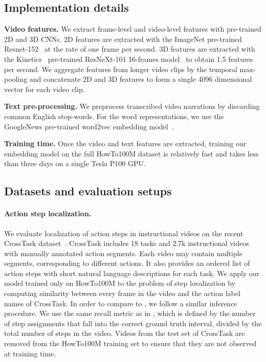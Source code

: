 \documentclass[10pt,twocolumn,letterpaper]{article}
\begin{document}
\subsection{Implementation details}
\label{implementation_details}
{\bf \noindent Video features.} 
We extract frame-level and video-level features with pre-trained 2D and 3D CNNs.
2D features are extracted with the ImageNet pre-trained Resnet-152~\cite{he16resnet} at the rate of one frame per second.
3D features are extracted with the Kinetics~\cite{carreira2017quovadis} pre-trained ResNeXt-101 16-frames model~\cite{hara183dcnns} to obtain 1.5 features per second.
We aggregate features from longer video clips by the temporal max-pooling and concatenate 2D and 3D features to form a single 4096 dimensional vector for each video clip.

{\bf \noindent Text pre-processing.} 
We preprocess transcribed video narrations by discarding common English stop-words. For the word representations, we use the GoogleNews pre-trained word2vec embedding model~\cite{mikolov13efficient}.


{\bf \noindent Training time.} 
Once the video and text features are extracted,
training our embedding model on the full HowTo100M dataset is relatively fast and takes less than three days on a single Tesla P100 GPU.

 
\subsection{Datasets and evaluation setups}
\label{dataset_evaluation}

\paragraph{Action step localization.}
We evaluate localization of action steps in instructional videos on the recent CrossTask dataset~\cite{zhukov2019crosstask}.
CrossTask includes 18 tasks and 2.7k instructional videos with manually annotated action segments. 
Each video may contain multiple segments, corresponding to different actions. 
It also provides an ordered list of action steps with short natural language descriptions for each task. 
We apply our model trained only on HowTo100M to the problem of step localization by computing similarity between every frame in the video and the action label names of CrossTask.
In order to compare to \cite{zhukov2019crosstask}, we follow a similar inference procedure.
We use the same recall metric as in \cite{zhukov2019crosstask}, which is defined by the number of step assignments that fall into the correct ground truth interval, divided by the total number of steps in the video.
Videos from the test set of CrossTask are removed from the HowTo100M training set to ensure that they are not observed at training time.
\end{document}
